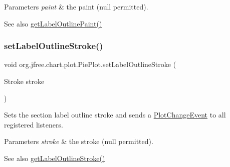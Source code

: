 \begin{DoxyParams}{Parameters}
{\em paint} & the paint ({\ttfamily null} permitted).\\
\hline
\end{DoxyParams}
\begin{DoxySeeAlso}{See also}
\mbox{\hyperlink{classorg_1_1jfree_1_1chart_1_1plot_1_1_pie_plot_ad8d6026aa75b647274e8ace856c7769a}{get\+Label\+Outline\+Paint()}} 
\end{DoxySeeAlso}
\mbox{\label{classorg_1_1jfree_1_1chart_1_1plot_1_1_pie_plot_a394062ead206b4b24ab655a8868bfa5e}} 
\subsubsection{\texorpdfstring{set\+Label\+Outline\+Stroke()}{setLabelOutlineStroke()}}
{\footnotesize\ttfamily void org.\+jfree.\+chart.\+plot.\+Pie\+Plot.\+set\+Label\+Outline\+Stroke (\begin{DoxyParamCaption}\item[{Stroke}]{stroke }\end{DoxyParamCaption})}

Sets the section label outline stroke and sends a \mbox{\hyperlink{}{Plot\+Change\+Event}} to all registered listeners.


\begin{DoxyParams}{Parameters}
{\em stroke} & the stroke ({\ttfamily null} permitted).\\
\hline
\end{DoxyParams}
\begin{DoxySeeAlso}{See also}
\mbox{\hyperlink{classorg_1_1jfree_1_1chart_1_1plot_1_1_pie_plot_a5b02eef0fa1268e222786b17e63b4ab9}{get\+Label\+Outline\+Stroke()}} 
\end{DoxySeeAlso}
\mbox{\label{classorg_1_1jfree_1_1chart_1_1plot_1_1_pie_plot_a4edc5bf4dba5fc8192522dd8b1a5c474}} 
